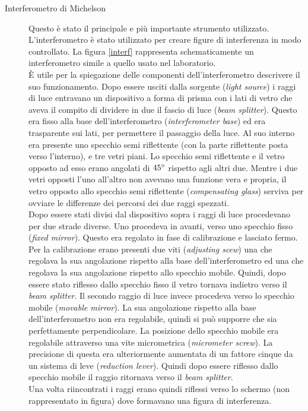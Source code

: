 \documentclass[a4paper,11pt]{article}
\begin{document}
\begin{description}
	
	\item[Interferometro di Michelson] Questo è stato il principale e più importante strumento utilizzato. L'interferometro è stato utilizzato per creare figure di interferenza in modo controllato. La figura \ref{interf} rappresenta schematicamente un interferometro simile a quello usato nel laboratorio.\\
	È utile per la spiegazione delle componenti dell'interferometro descrivere il suo funzionamento. Dopo essere usciti dalla sorgente (\emph{light source}) i raggi di luce entravano un dispositivo a forma di prisma con i lati di vetro che aveva il compito di dividere in due il fascio di luce (\emph{beam splitter}).
	Questo era fisso alla base dell'interferometro (\emph{interferometer base}) ed era trasparente sui lati, per permettere il passaggio della luce. Al suo interno era presente uno specchio semi riflettente (con la parte riflettente posta verso l'interno), e tre vetri piani. Lo specchio semi riflettente e il vetro opposto ad esso erano angolati di $ 45\degree $ rispetto agli altri due. Mentre i due vetri opposti l'uno all'altro non avevano una funzione vera e propria, il vetro opposto allo specchio semi riflettente (\emph{compensating glass}) serviva per ovviare le differenze dei percorsi dei due raggi spezzati.\\
	Dopo essere stati divisi dal dispositivo sopra i raggi di luce procedevano per due strade diverse. Uno procedeva in avanti, verso uno specchio fisso (\emph{fixed mirror}). Questo era regolato in fase di calibrazione e lasciato fermo. Per la calibrazione erano presenti due viti (\emph{adjusting scew}) una che regolava la sua angolazione rispetto alla base dell'interferometro ed una che regolava la sua angolazione rispetto allo specchio mobile. Quindi, dopo essere stato riflesso dallo specchio fisso il vetro tornava indietro verso il \emph{beam splitter}. Il secondo raggio di luce invece procedeva verso lo specchio mobile (\emph{movable mirror}). La sua angolazione rispetto alla base dell'interferometro non era regolabile, quindi si può supporre che sia perfettamente perpendicolare. La posizione dello specchio mobile era regolabile attraverso una vite micrometrica (\emph{micrometer screw}). La precisione di questa era ulteriormente aumentata di un fattore cinque da un sistema di leve (\emph{reduction lever}). Quindi dopo essere riflesso dallo specchio mobile il raggio ritornava verso il \emph{beam splitter}.\\
	Una volta riincontrati i raggi erano quindi riflessi verso lo schermo (non rappresentato in figura) dove formavano una figura di interferenza.

\end{description}
\end{document}
